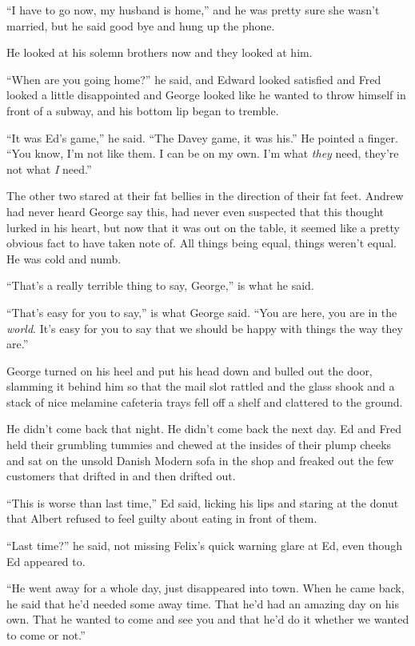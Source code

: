 ``I have to go now, my husband is home,'' and he was pretty sure she
wasn't married, but he said good bye and hung up the phone.

He looked at his solemn brothers now and they looked at him.

``When are you going home?'' he said, and Edward looked satisfied and
Fred looked a little disappointed and George looked like he wanted to
throw himself in front of a subway, and his bottom lip began to
tremble.

``It was Ed's game,'' he said.  ``The Davey game, it was his.'' He
pointed a finger.  ``You know, I'm not like them.  I can be on my own. 
I'm what \textit{they} need, they're not what \textit{I} need.''

The other two stared at their fat bellies in the direction of their
fat feet.  Andrew had never heard George say this, had never even
suspected that this thought lurked in his heart, but now that it was
out on the table, it seemed like a pretty obvious fact to have taken
note of.  All things being equal, things weren't equal.  He was cold
and numb.

``That's a really terrible thing to say, George,'' is what he said.

``That's easy for you to say,'' is what George said.  ``You are here,
you are in the \textit{world}.  It's easy for you to say that we
should be happy with things the way they are.''

George turned on his heel and put his head down and bulled out the
door, slamming it behind him so that the mail slot rattled and the
glass shook and a stack of nice melamine cafeteria trays fell off a
shelf and clattered to the ground.

He didn't come back that night.  He didn't come back the next day.  Ed
and Fred held their grumbling tummies and chewed at the insides of
their plump cheeks and sat on the unsold Danish Modern sofa in the
shop and freaked out the few customers that drifted in and then
drifted out.

``This is worse than last time,'' Ed said, licking his lips and
staring at the donut that Albert refused to feel guilty about eating
in front of them.

``Last time?'' he said, not missing Felix's quick warning glare at Ed,
even though Ed appeared to.

``He went away for a whole day, just disappeared into town.  When he
came back, he said that he'd needed some away time.  That he'd had an
amazing day on his own.  That he wanted to come and see you and that
he'd do it whether we wanted to come or not.''

